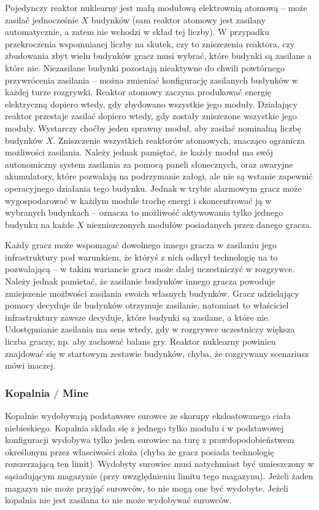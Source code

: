 \documentclass[11pt,a4paper]{article}
\begin{document}
Pojedynczy reaktor nuklearny jest małą modułową elektrownią atomową -- może zasilać jednocześnie $X$ budynków (sam reaktor atomowy jest zasilany automatycznie, a zatem nie wchodzi w skład tej liczby). W przypadku przekroczenia wspomnianej liczby na skutek, czy to zniszczenia reaktora, czy zbudowania zbyt wielu budynków gracz musi wybrać, które budynki są zasilane a które nie. Niezasilane budynki pozostają nieaktywne do chwili powtórnego przywrócenia zasilania -- można zmieniać konfigurację zasilanych budynków w każdej turze rozgrywki. Reaktor atomowy zaczyna produkować energię elektryczną dopiero wtedy, gdy zbydowano wszystkie jego moduły. Działający reaktor przestaje zasilać dopiero wtedy, gdy zostały zniszczone wszystkie jego moduły. Wystarczy choćby jeden sprawny moduł, aby zasilać nominalną liczbę budynków $X$. Zniszczenie wszystkich reaktorów atomowych, znacząco ogranicza możliwości zasilania. Należy jednak pamiętać, że każdy moduł ma swój autonomiczny system zasilania za pomocą paneli słonecznych, oraz awaryjne akumulatory, które pozwalają na podrzymanie załogi, ale nie są wstanie zapewnić operacyjnego działania tego budynku. Jednak w trybie alarmowym gracz może wygospodarować w każdym module trochę energi i skoncentrować ją w wybranych budynkach -- oznacza to możliwość aktywowania tylko jednego budynku na każde $X$ niezniszczonych modułów posiadanych przez danego gracza.

Każdy gracz może wspomagać dowolnego innego gracza w zasilaniu jego infrastruktury pod warunkiem, że któryś z nich odkrył technologię na to pozwalającą -- w takim wariancie gracz może dalej uczestniczyć w rozgrywce. Należy jednak pamietać, że zasilanie budynków innego gracza powoduje zmiejszenie możlwości zasilania swoich własnych budynków. Gracz udzielający pomocy decyduje ile budynków otrzymuje zasilanie, natomiast to właściciel infrastruktury zawsze decyduje, które budynki są zasilane, a które nie. Udostępnianie zasilania ma sens wtedy, gdy w rozgrywce uczestniczy większa liczba graczy, np. aby zachować balans gry. Reaktor nuklearny powinien znajdować się w startowym zestawie budynków, chyba, że rozgrywany scenariusz mówi inaczej.

\subsubsection{Kopalnia $/$ Mine }

Kopalnie wydobywają podstawowe surowce ze skorupy eksloatowanego ciała niebieskiego. Kopalnia składa się z jednego tylko modułu i w podstawowej konfiguracji wydobywa tylko jeden surowiec na turę z prawdopodobieństwem określonym przez własciwości złoża (chyba że gracz posiada technologię rozszerzającą ten limit). Wydobyty surowiec musi natychmiast być umieszczony w sąsiadującym magazynie (przy uwzględnieniu limitu tego magazynu). Jeżeli żaden magazyn nie może przyjąć surowców, to nie mogą one być wydobyte. Jeżeli kopalnia nie jest zasilana to nie może wydobywać surowców.
\end{document}
